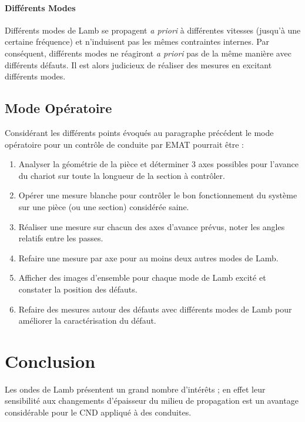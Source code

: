 \paragraph{Différents Modes}
Différents modes de Lamb se propagent \textit{a priori} à différentes vitesses (jusqu'à une certaine fréquence)  et n'induisent pas les mêmes contraintes internes. Par conséquent, différents modes ne réagiront \textit{a priori} pas de la même manière avec différents défauts. Il est alors judicieux de réaliser des mesures en excitant différents modes.

\subsection{Mode Opératoire}

Considérant les différents points évoqués au paragraphe précédent le mode opératoire pour un contrôle de conduite par EMAT pourrait être :

\begin{enumerate}
    \item Analyser la géométrie de la pièce et déterminer 3 axes possibles pour l'avance du chariot sur toute la longueur de la section à contrôler.
    \item Opérer une mesure blanche pour contrôler le bon fonctionnement du système sur une pièce (ou une section) considérée saine.
    \item Réaliser une mesure sur chacun des axes d'avance prévus, noter les angles relatifs entre les passes.
    \item Refaire une mesure par axe pour au moins deux autres modes de Lamb.
    \item Afficher des images d'ensemble pour chaque mode de Lamb excité et constater la position des défauts.
    \item Refaire des mesures autour des défauts avec différents modes de Lamb pour améliorer la caractérisation du défaut.
\end{enumerate}

\newpage

\section*{Conclusion}

Les ondes de Lamb présentent un grand nombre d'intérêts ; en effet leur sensibilité aux changements d'épaisseur du milieu de propagation est un avantage considérable pour le CND appliqué à des conduites.

